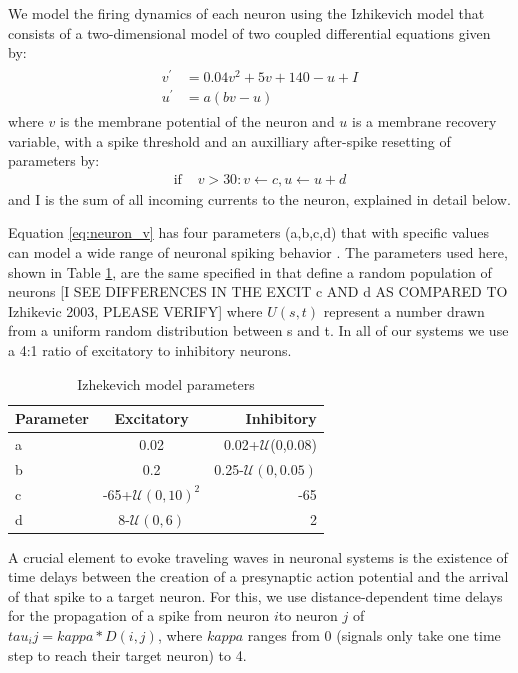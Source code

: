 \documentclass[a4paper,11pt]{article}
\begin{document}
We model the firing dynamics of each neuron using the Izhikevich model \cite{izhikevich2003} that consists of a two-dimensional model of two coupled differential equations given by:
\begin{align}
 \begin{split}
  v^\prime &= 0.04v^2+5v+140-u+I \label{eq:neuron_v} \\
  u^\prime &= a(bv-u)
 \end{split}
\end{align}
where $v$ is the membrane potential of the neuron and $u$ is a membrane recovery variable, with a spike threshold and an auxilliary after-spike resetting of parameters by:
\begin{align}
  \text{if } &v>30: v\leftarrow c, u\leftarrow u+d
\end{align}
and I is the sum of all incoming currents to the neuron, explained in detail below. 

Equation \ref{eq:neuron_v} has four parameters (a,b,c,d) that with specific values can model a wide range of neuronal spiking behavior \cite{izhikevich2003}. 
The parameters used here, shown in Table \ref{tab:izzy_params}, are the same specified in \cite{izhikevich2003} that define a random population of neurons [I SEE DIFFERENCES 
IN THE EXCIT c AND d AS COMPARED TO Izhikevic 2003, PLEASE VERIFY] where $U(s,t)$ represent a number drawn from a uniform random distribution between s and t. 
In all of our systems we use a 4:1 ratio of excitatory to inhibitory neurons.
\begin{table}[!h]
 \caption{Izhekevich model parameters}
 \label{tab:izzy_params}
 \centering
 \begin{tabular}{l|c|r}
  \textbf{Parameter} & \textbf{Excitatory} & \textbf{Inhibitory} \\
  \hline
  a & 0.02 & 0.02+$\mathcal{U}$(0,0.08) \\
  b & 0.2 & 0.25-$\mathcal{U}(0,0.05)$\\
  c & -65+$\mathcal{U}(0,10)^2$ & -65 \\
  d & 8-$\mathcal{U}(0,6)$& 2 \\
 \end{tabular}
\end{table}

A crucial element to evoke traveling waves in neuronal systems is the existence of time delays between the creation of a presynaptic action potential and the arrival of that spike to a target neuron. 
For this, we use distance-dependent time delays for the propagation of a spike from neuron $i$to neuron $j$ of $tau_ij = kappa * D(i,j)$, where $kappa$ ranges from 0 (signals only take one time step to reach their target neuron) to 4. 
\end{document}
